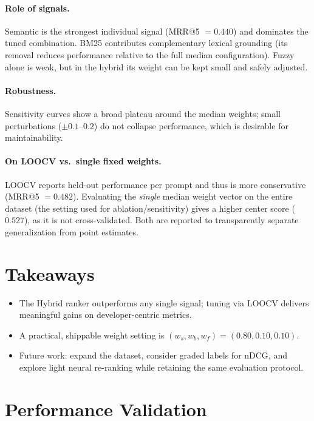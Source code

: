 \paragraph{Role of signals.} Semantic is the strongest individual signal (MRR@5 $=0.440$) and dominates the tuned combination. BM25 contributes complementary lexical grounding (its removal reduces performance relative to the full median configuration). Fuzzy alone is weak, but in the hybrid its weight can be kept small and safely adjusted.

\paragraph{Robustness.} Sensitivity curves show a broad plateau around the median weights; small perturbations ($\pm 0.1$–$0.2$) do not collapse performance, which is desirable for maintainability.

\paragraph{On LOOCV vs.\ single fixed weights.} LOOCV reports held-out performance per prompt and thus is more conservative (MRR@5 $=0.482$). Evaluating the \emph{single} median weight vector on the entire dataset (the setting used for ablation/sensitivity) gives a higher center score ($0.527$), as it is not cross-validated. Both are reported to transparently separate generalization from point estimates.

\section{Takeaways}
\label{sec:evaluation-takeaways}
\begin{itemize}
 \item The Hybrid ranker outperforms any single signal; tuning via LOOCV delivers meaningful gains on developer-centric metrics.
 \item A practical, shippable weight setting is \textbf{$(w_s,w_b,w_f)=(0.80,0.10,0.10)$}.
 \item Future work: expand the dataset, consider graded labels for nDCG, and explore light neural re-ranking while retaining the same evaluation protocol.
\end{itemize}

\section{Performance Validation}
\label{sec:performance-validation}

